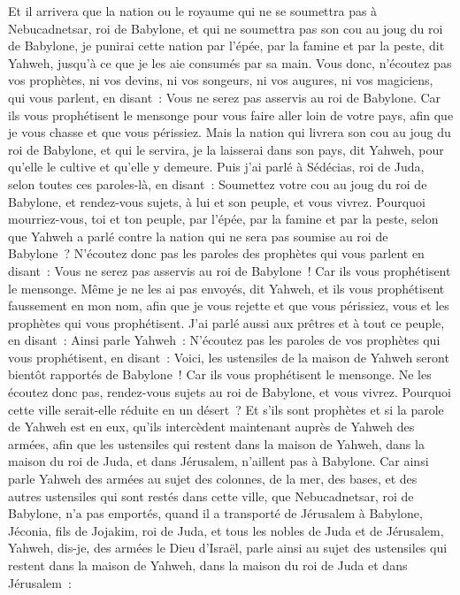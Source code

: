 \begin{multicols}{2}
Et il arrivera que la nation ou le royaume qui ne se soumettra pas à Nebucadnetsar, roi de Babylone, et qui ne soumettra pas son cou au joug du roi de Babylone, je punirai cette nation par l'épée, par la famine et par la peste, dit Yahweh, jusqu'à ce que je les aie consumés par sa main.
Vous donc, n'écoutez pas vos prophètes, ni vos devins, ni vos songeurs, ni vos augures, ni vos magiciens, qui vous parlent, en disant~: Vous ne serez pas asservis au roi de Babylone.
Car ils vous prophétisent le mensonge pour vous faire aller loin de votre pays, afin que je vous chasse et que vous périssiez.
Mais la nation qui livrera son cou au joug du roi de Babylone, et qui le servira, je la laisserai dans son pays, dit Yahweh, pour qu'elle le cultive et qu'elle y demeure.
Puis j'ai parlé à Sédécias, roi de Juda, selon toutes ces paroles-là, en disant~: Soumettez votre cou au joug du roi de Babylone, et rendez-vous sujets, à lui et son peuple, et vous vivrez.
Pourquoi mourriez-vous, toi et ton peuple, par l'épée, par la famine et par la peste, selon que Yahweh a parlé contre la nation qui ne sera pas soumise au roi de Babylone~?
N'écoutez donc pas les paroles des prophètes qui vous parlent en disant~: Vous ne serez pas asservis au roi de Babylone~! Car ils vous prophétisent le mensonge.
Même je ne les ai pas envoyés, dit Yahweh, et ils vous prophétisent faussement en mon nom, afin que je vous rejette et que vous périssiez, vous et les prophètes qui vous prophétisent.
J'ai parlé aussi aux prêtres et à tout ce peuple, en disant~: Ainsi parle Yahweh~: N'écoutez pas les paroles de vos prophètes qui vous prophétisent, en disant~: Voici, les ustensiles de la maison de Yahweh seront bientôt rapportés de Babylone~! Car ils vous prophétisent le mensonge.
Ne les écoutez donc pas, rendez-vous sujets au roi de Babylone, et vous vivrez. Pourquoi cette ville serait-elle réduite en un désert~?
Et s'ils sont prophètes et si la parole de Yahweh est en eux, qu'ils intercèdent maintenant auprès de Yahweh des armées, afin que les ustensiles qui restent dans la maison de Yahweh, dans la maison du roi de Juda, et dans Jérusalem, n'aillent pas à Babylone.
Car ainsi parle Yahweh des armées au sujet des colonnes, de la mer, des bases, et des autres ustensiles qui sont restés dans cette ville,
que Nebucadnetsar, roi de Babylone, n'a pas emportés, quand il a transporté de Jérusalem à Babylone, Jéconia, fils de Jojakim, roi de Juda, et tous les nobles de Juda et de Jérusalem,
Yahweh, dis-je, des armées le Dieu d'Israël, parle ainsi au sujet des ustensiles qui restent dans la maison de Yahweh, dans la maison du roi de Juda et dans Jérusalem~:

\end{multicols}
